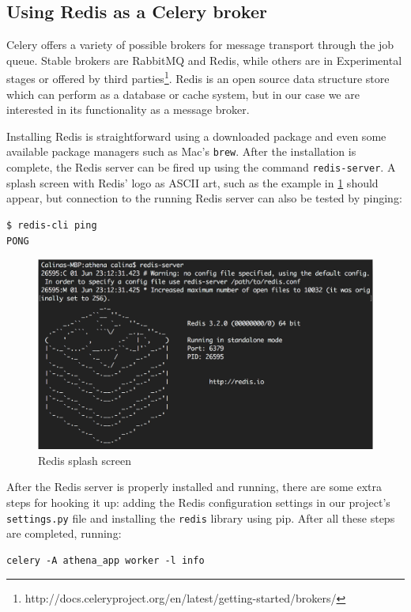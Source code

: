 \subsection{Using Redis as a Celery broker}
Celery offers a variety of possible brokers for message transport through the job queue. Stable brokers are RabbitMQ and Redis, while others are in Experimental stages or offered by third parties\footnote{http://docs.celeryproject.org/en/latest/getting-started/brokers/}. Redis is an open source data structure store which can perform as a database or cache system, but in our case we are interested in its functionality as a message broker.

Installing Redis is straightforward using a downloaded package and even some available package managers such as Mac's \texttt{brew}. After the installation is complete, the Redis server can be fired up using the command \texttt{redis-server}. A splash screen with Redis' logo as ASCII art, such as the example in \ref{fig:redis} should appear, but connection to the running Redis server can also be tested by pinging:

\lstset{basicstyle=\small}
\begin{lstlisting}
$ redis-cli ping
PONG
\end{lstlisting}

\begin{figure}[ht]
    \centering
\includegraphics[width=0.8\columnwidth]{img/redis-splash.png}
    \caption{Redis splash screen}
    \label{fig:redis}
\end{figure}

After the Redis server is properly installed and running, there are some extra steps for hooking it up: adding the Redis configuration settings in our project's \texttt{settings.py} file and installing the \texttt{redis} library using pip. After all these steps are completed, running:

\lstset{basicstyle=\small}
\begin{lstlisting}
celery -A athena_app worker -l info
\end{lstlisting}


